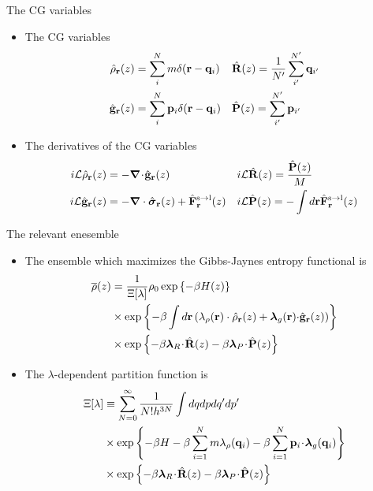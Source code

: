 \documentclass{beamer}
\newcommand{\esc}{\!\cdot\!}
\begin{document}
\begin{frame}{The CG variables}
  \begin{itemize}
    \item The CG variables
\begin{align}
  \hat{\rho}_{\bf r}(z) &=\sum^{N}_im\delta({\bf r}-{\bf q}_i)
&&\hat{\bf R}(z)=\frac{1}{N'}\sum_{i'}^{N'}{\bf q}_{i'}
\nonumber\\
  \hat{\bf g}_{\bf r}(z) &=\sum^{N}_i{\bf p}_i\delta({\bf r}-{\bf q}_i)
&&\hat{\bf P}(z)=\sum_{i'}^{N'}{\bf p}_{i'}
\nonumber
\end{align}
\item The derivatives of the CG variables
\begin{align}
  i{\cal L} \hat{\rho}_{\bf r}(z) &= -\boldsymbol{\nabla}\esc\hat{\bf g}_{\bf r}(z)
  && i{\cal L}\hat{\bf R}(z) =\frac{\hat{\bf P}(z)}{M}
\nonumber\\
i{\cal L}\hat{\bf g}_{\bf r}(z)
    &=-\boldsymbol{\nabla}\cdot \hat{\boldsymbol{\sigma}}_{\bf r}(z)+\hat{{\bf F}}^{\rm s\to l}_{\bf r}(z) 
  &&i{\cal L}\hat{\bf P}(z) =-\int  d{\bf r} \hat{\bf F}^{\rm s\to l}_{\bf r}(z)
   \nonumber
\end{align}
    \end{itemize}
\end{frame}

\begin{frame}{The relevant enesemble}
  \begin{itemize}
    \item The ensemble which maximizes the Gibbs-Jaynes entropy functional is
\begin{align}
  \overline{\rho}(z)&=\frac{1}{\Xi[\lambda]}\rho_0\exp\left\{-\beta H(z)\right\}
\nonumber\\
&\times
\exp\left\{-\beta\int d{\bf r}\left(\lambda_\rho({\bf r})\cdot\hat{\rho}_{\bf
    r}(z)+\boldsymbol{\lambda}_g{({\bf r})\cdot}\hat{\bf g}_{\bf r}(z)\right)\right\}
\nonumber\\
&\times
\exp\left\{-\beta \boldsymbol{\lambda}_{R}\esc\hat{\bf R}(z)
-\beta \boldsymbol{\lambda}_{P}\esc\hat{\bf P}(z)\right\}
\nonumber
\end{align}
\item The $\lambda$-dependent partition function is
\begin{align}
  \Xi[\lambda]
  &\equiv
 \sum_{N=0}^\infty \frac{1}{N!h^{3N}}
\int dqdp dq'dp'
\nonumber\\
&\times\exp\left\{-\beta H-\beta \sum_{i=1}^Nm \lambda_\rho({\bf
    q}_i)-\beta \sum_{i=1}^N{\bf p}_i\esc\boldsymbol{\lambda}_g({\bf q}_i)\right\}
\nonumber\\
&\times\exp\left\{-\beta \boldsymbol{\lambda}_{R}\esc\hat{\bf R}(z)
-\beta \boldsymbol{\lambda}_{P}\esc\hat{\bf P}(z)\right\}
\nonumber
\end{align}
\end{itemize}
\end{frame}
\end{document}
